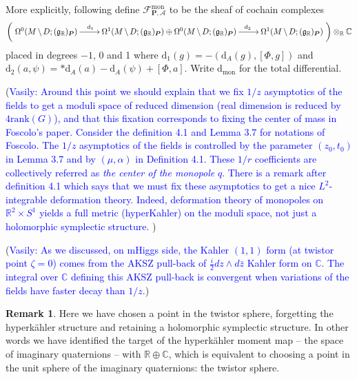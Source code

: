 \documentclass[11pt, oneside, reqno]{amsart}
\theoremstyle{definition} \newtheorem{definition}{Definition}[section]
\theoremstyle{definition} \newtheorem{remark}[definition]{Remark}
\theoremstyle{definition} \newtheorem{remarks}[definition]{Remarks}
\theoremstyle{definition} \newtheorem{question}[definition]{Question}
\theoremstyle{definition} \newtheorem*{note}{Note}
\theoremstyle{definition} \newtheorem{example}[definition]{Example}
\theoremstyle{definition} \newtheorem{examples}[definition]{Examples}
\renewcommand{\gg}{\mathfrak{g}}
\newcommand{\mr}[1]{\mathrm{#1}}
\newcommand{\mc}[1]{\mathcal{#1}}
\newcommand{\bo}[1]{\boldsymbol{#1}}
\newcommand{\bs}{\ \backslash \ }
\newcommand{\CC}{\mathbb{C}}
\newcommand{\RR}{\mathbb{R}}
\renewcommand{\d}{\mathrm{d}}
\newcommand{\vasily}[1]{(\textcolor{blue}{Vasily: #1})}
\begin{document}
More explicitly, following \cite{FoscoloDef} define $\mc F^{\mr{mon}}_{\bo P, \mc A}$ to be the sheaf of cochain complexes
\[\left(\xymatrix{
\Omega^0(M \!\bs\! D; (\gg_\RR)_{\bo P}) \ar[r]^(.36){\d_1} &\Omega^1(M \!\bs\! D; (\gg_\RR)_{\bo P}) \oplus \Omega^0(M \!\bs\! D; (\gg_\RR)_{\bo P}) \ar[r]^(.64){\d_2} &\Omega^1(M \!\bs\! D; (\gg_\RR)_{\bo P})
}\right) \otimes_\RR \CC\]
placed in degrees $-1$, 0 and 1 where $\d_1(g) = -(\d_A(g),[\Phi, g])$ and $\d_2(a,\psi) = \ast \d_A(a) - \d_A(\psi) + [\Phi,a]$.  Write $\d_{\mr{mon}}$ for the total differential.

\vasily{Around this point we should explain that we fix $1/z$ asymptotics
  of the fields to get a moduli space of reduced dimension (real dimension 
is reduced by $4 \mathrm{rank} (G)$),  and that this fixation corresponds to fixing the
  center of mass in Foscolo's paper. Consider the definition 4.1 and Lemma 3.7
  for notations of Foscolo. The $1/z$ asymptotics of the fields
  is controlled by the parameter $(z_0, t_0)$ in Lemma 3.7
  and by $(\mu, \alpha)$ in Definition 4.1. These $1/r$ coefficients
  are collectively referred as \emph{the center of the monopole} $q$.
  There is a remark after definition 4.1 which says that we must
  fix these asymptotics to get a nice $L^2$-integrable deformation theory.
  Indeed, deformation theory of monopoles on $\mathbb{R}^2 \times S^1$ yields
  a full metric (hyperKahler) on the moduli space, not just a holomorphic
  symplectic structure.  }

\vasily{
 As we discussed, on mHiggs side, the Kahler $(1,1)$ form
  (at twistor point $\zeta = 0$) comes from the AKSZ pull-back
  of $ \frac{i}{2} dz \wedge d{\bar z}$ Kahler form on $\mathbb{C}$.
  The integral over $\mathbb{C}$ defining this AKSZ pull-back
  is convergent when variations of the fields have faster decay
  than $1/z$.}
  



\begin{remark}
Here we have chosen a point in the twistor sphere, forgetting the hyperk\"ahler structure and retaining a holomorphic symplectic structure.  In other words we have identified the target of the hyperk\"ahler moment map -- the space of imaginary quaternions -- with $\RR \oplus \CC$, which is equivalent to choosing a point in the unit sphere of the imaginary quaternions: the twistor sphere.  
\end{remark}
\end{document}
